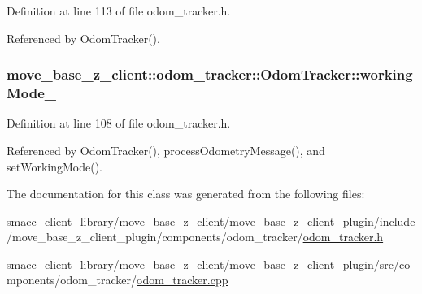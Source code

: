 Definition at line 113 of file odom\+\_\+tracker.\+h.



Referenced by Odom\+Tracker().

\subsubsection[{\texorpdfstring{working\+Mode\+\_\+}{workingMode_}}]{ move\+\_\+base\+\_\+z\+\_\+client\+::odom\+\_\+tracker\+::\+Odom\+Tracker\+::working\+Mode\+\_\+\hspace{0.3cm}{\ttfamily [protected]}}\hypertarget{classmove__base__z__client_1_1odom__tracker_1_1OdomTracker_a39c97d7bf6003fde62e0bed1a221e3f0}{}\label{classmove__base__z__client_1_1odom__tracker_1_1OdomTracker_a39c97d7bf6003fde62e0bed1a221e3f0}


Definition at line 108 of file odom\+\_\+tracker.\+h.



Referenced by Odom\+Tracker(), process\+Odometry\+Message(), and set\+Working\+Mode().



The documentation for this class was generated from the following files\+:\begin{DoxyCompactItemize}
\item 
smacc\+\_\+client\+\_\+library/move\+\_\+base\+\_\+z\+\_\+client/move\+\_\+base\+\_\+z\+\_\+client\+\_\+plugin/include/move\+\_\+base\+\_\+z\+\_\+client\+\_\+plugin/components/odom\+\_\+tracker/\hyperlink{odom__tracker_8h}{odom\+\_\+tracker.\+h}\item 
smacc\+\_\+client\+\_\+library/move\+\_\+base\+\_\+z\+\_\+client/move\+\_\+base\+\_\+z\+\_\+client\+\_\+plugin/src/components/odom\+\_\+tracker/\hyperlink{odom__tracker_8cpp}{odom\+\_\+tracker.\+cpp}\end{DoxyCompactItemize}
